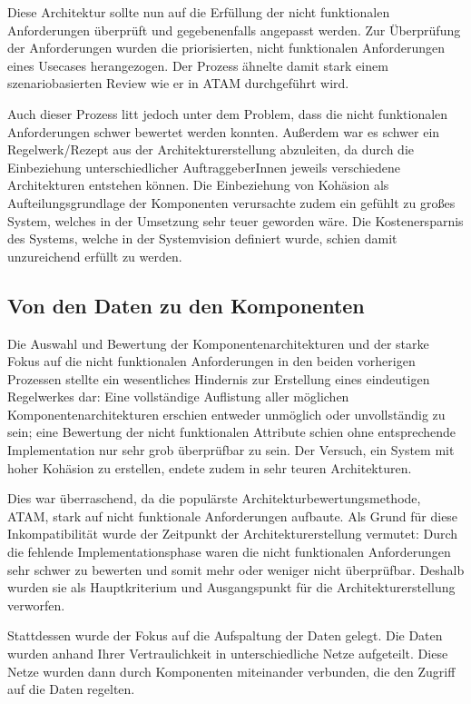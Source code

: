 Diese Architektur sollte nun auf die Erfüllung der nicht funktionalen Anforderungen überprüft und gegebenenfalls angepasst werden. Zur Überprüfung der Anforderungen wurden die priorisierten, nicht funktionalen Anforderungen eines Usecases herangezogen. Der Prozess ähnelte damit stark einem szenariobasierten Review wie er in ATAM durchgeführt wird.

Auch dieser Prozess litt jedoch unter dem Problem, dass die nicht funktionalen Anforderungen schwer bewertet werden konnten. Außerdem war es schwer ein Regelwerk/Rezept aus der Architekturerstellung abzuleiten, da durch die Einbeziehung unterschiedlicher AuftraggeberInnen jeweils verschiedene Architekturen entstehen können. Die Einbeziehung von Kohäsion als Aufteilungsgrundlage der Komponenten verursachte zudem ein gefühlt zu großes System, welches in der Umsetzung sehr teuer geworden wäre. Die Kostenersparnis des Systems, welche in der Systemvision definiert wurde, schien damit unzureichend erfüllt zu werden.

\subsection{Von den Daten zu den Komponenten}
Die Auswahl und Bewertung der Komponentenarchitekturen und der starke Fokus auf die nicht funktionalen Anforderungen in den beiden vorherigen Prozessen stellte ein wesentliches Hindernis zur Erstellung eines eindeutigen Regelwerkes dar: Eine vollständige Auflistung aller möglichen Komponentenarchitekturen erschien entweder unmöglich oder unvollständig zu sein; eine Bewertung der nicht funktionalen Attribute schien ohne entsprechende Implementation nur sehr grob überprüfbar zu sein. Der Versuch, ein System mit hoher Kohäsion zu erstellen, endete zudem in sehr teuren Architekturen.

Dies war überraschend, da die populärste Architekturbewertungsmethode, ATAM, stark auf nicht funktionale Anforderungen aufbaute. Als Grund für diese Inkompatibilität wurde der Zeitpunkt der Architekturerstellung vermutet: Durch die fehlende Implementationsphase waren die nicht funktionalen Anforderungen sehr schwer zu bewerten und somit mehr oder weniger nicht überprüfbar. Deshalb wurden sie als Hauptkriterium und Ausgangspunkt für die Architekturerstellung verworfen.

Stattdessen wurde der Fokus auf die Aufspaltung der Daten gelegt. Die Daten wurden anhand Ihrer Vertraulichkeit in unterschiedliche Netze aufgeteilt. Diese Netze wurden dann durch Komponenten miteinander verbunden, die den Zugriff auf die Daten regelten.

